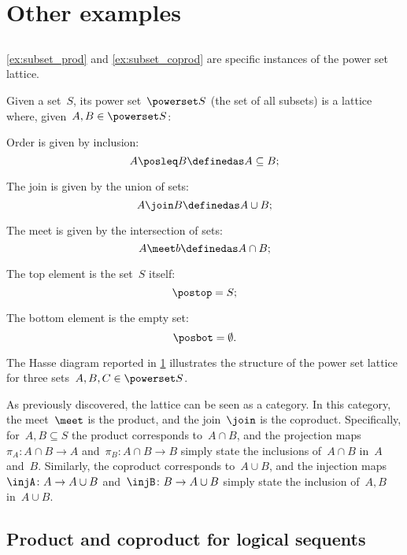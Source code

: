 \section{Other examples}

\subsection{}
\cref{ex:subset_prod} and \cref{ex:subset_coprod} are specific instances of the power set lattice.

\begin{definition}
  \label{def:power-set-as-lattice}
Given a set~$S$, its power set~$\powerset S$ (the set of all subsets) is a lattice where, given~$A,B\in \powerset S$:
\begin{compactitem}
  \item Order is given by inclusion:
  \begin{equation*}
    A\posleq B \definedas A\subseteq B;
  \end{equation*}
  \item The join is given by the union of sets:
  \begin{equation*}
    A\join B \definedas A\cup B;
  \end{equation*}
  \item The meet is given by the intersection of sets:
  \begin{equation*}
    A\meet b \definedas A\cap B;
  \end{equation*}
  \item The top element is the set~$S$ itself:
  \begin{equation*}
    \postop = S;
  \end{equation*}
  \item The bottom element is the empty set:
  \begin{equation*}
    \posbot = \emptyset.
  \end{equation*}
\end{compactitem}
\end{definition}

The Hasse diagram reported in \cref{fig:prod_coprod_power} illustrates the structure of the power set lattice for three sets~$A,B,C\in \powerset S$.

\begin{figure}[h]
  \begin{center}
  \end{center}
  \caption{}
  \label{fig:prod_coprod_power}
\end{figure}
As previously discovered, the lattice can be seen as a category.
In this category, the meet~$\meet$ is the product, and the join~$\join$ is the coproduct.
Specifically, for~$A,B\subseteq S$ the product corresponds to~$A\cap B$, and the projection maps~$\pi_A\colon A\cap B\to A$ and~$\pi_B\colon A\cap B\to B$ simply state the inclusions of~$A\cap B$ in~$A$ and~$B$.
Similarly, the coproduct corresponds to~$A\cup B$, and the injection maps~$\injA\colon A\to A\cup B$ and~$\injB\colon B\to A\cup B$ simply state the inclusion of~$A,B$ in~$A\cup B$.

\subsection{Product and coproduct for logical sequents}

